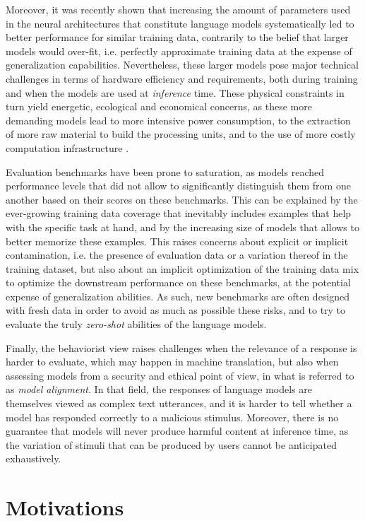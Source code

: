 Moreover, it was recently shown that increasing the amount of parameters used in the neural architectures that constitute language models systematically led to better performance for similar training data, contrarily to the belief that larger models would over-fit, i.e. perfectly approximate training data at the expense of generalization capabilities. Nevertheless, these larger models pose major technical challenges in terms of hardware efficiency and requirements, both during training and when the models are used at \textit{inference} time. These physical constraints in turn yield energetic, ecological and economical concerns, as these more demanding models lead to more intensive power consumption, to the extraction of more raw material to build the processing units, and to the use of more costly computation infrastructure \citep{ecolo_llm}.

Evaluation benchmarks have been prone to saturation, as models reached performance levels that did not allow to significantly distinguish them from one another based on their scores on these benchmarks. This can be explained by the ever-growing training data coverage that inevitably includes examples that help with the specific task at hand, and by the increasing size of models that allows to better memorize these examples. This raises concerns about explicit or implicit contamination, i.e. the presence of evaluation data or a variation thereof in the training dataset, but also about an implicit optimization of the training data mix to optimize the downstream performance on these benchmarks, at the potential expense of generalization abilities. As such, new benchmarks are often designed with fresh data in order to avoid as much as possible these risks, and to try to evaluate the truly \textit{zero-shot} abilities of the language models.

Finally, the behaviorist view raises challenges when the relevance of a response is harder to evaluate, which may happen in machine translation, but also when assessing models from a security and ethical point of view, in what is referred to as \textit{model alignment}. In that field, the responses of language models are themselves viewed as complex text utterances, and it is harder to tell whether a model has responded correctly to a malicious stimulus. Moreover, there is no guarantee that models will never produce harmful content at inference time, as the variation of stimuli that can be produced by users cannot be anticipated exhaustively.


\section{Motivations}

